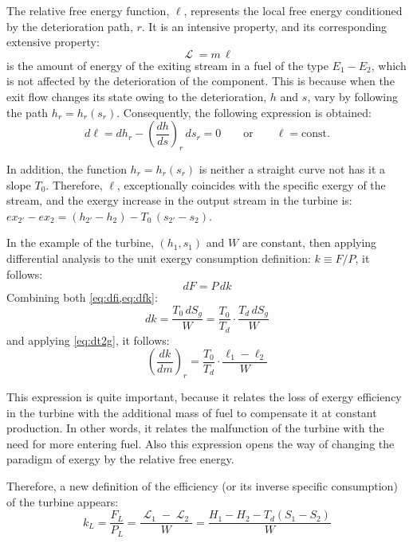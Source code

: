 \documentclass[energies,article,submit,moreauthors,pdftex]{Definitions/mdpi}
\DeclareMathOperator{\Lgdr}{\mathcal{L}}
\begin{document}
The relative free energy function, $\ell$, represents the local free energy conditioned by the deterioration path, $r$. It is an intensive property, and its corresponding extensive property:
\begin{equation}
\Lgdr = m\,\ell
\end{equation}
is the amount of energy of the exiting stream in a fuel of the type $E_1-E_2$, which is not affected by the deterioration of the component. This is because when the exit flow changes its state owing to the deterioration, $h$ and $s$, vary by following the path $h_r = h_r (s_r)$. Consequently, the following expression is obtained:
\begin{equation}
d\ell = dh_r - \left(\frac{dh}{ds}\right)_r\, ds_r = 0 \qquad  \text{or} \qquad \ell = \text{const}.
\end{equation}

In addition, the function $h_r = h_r(s_r)$ is neither a straight curve not has it a slope $T_0$. Therefore, $\ell$, exceptionally coincides with the specific exergy of the stream, and the exergy increase in the output stream in the turbine is: $ex_{2'}-ex_{2}=(h_{2'}-h_2)-T_0\,(s_{2'}-s_2)$.

In the example of the turbine, $(h_1, s_1)$ and $W$ are constant, then applying differential analysis to the unit exergy consumption definition: $k\equiv F/P$, it follows:
\begin{equation}
dF=P\,dk
\label{eq:dfk}
\end{equation}
Combining both \cref{eq:dfi,eq:dfk}:
\begin{equation}
dk=\frac{T_0\,dS_g}{W}=\frac{T_0}{T_d}\cdot\frac{T_d \, dS_g}{W}
\end{equation}
and applying \cref{eq:dt2g}, it follows:
\begin{equation}
\left(\frac{dk}{dm}\right)_r = \frac{T_0}{T_d} \cdot \frac{\ell_1 - \ell_2}{W}
\end{equation}

This expression is quite important, because it relates the loss of exergy efficiency in the turbine with the additional mass of fuel to compensate it at constant production. In other words, it relates the malfunction of the turbine with the need for more entering fuel. Also this expression opens the way of changing the paradigm of exergy by the relative free energy.

Therefore, a new definition of the efficiency (or its inverse specific consumption) of the turbine appears:
\begin{equation}
k_L = \frac{F_L}{P_L} = \frac{\Lgdr_1 - \Lgdr_2}{W}=\frac{H_1-H_2-T_d \left(S_1 - S_2\right)}{W}
\label{eq:kL}
\end{equation}
\end{document}
